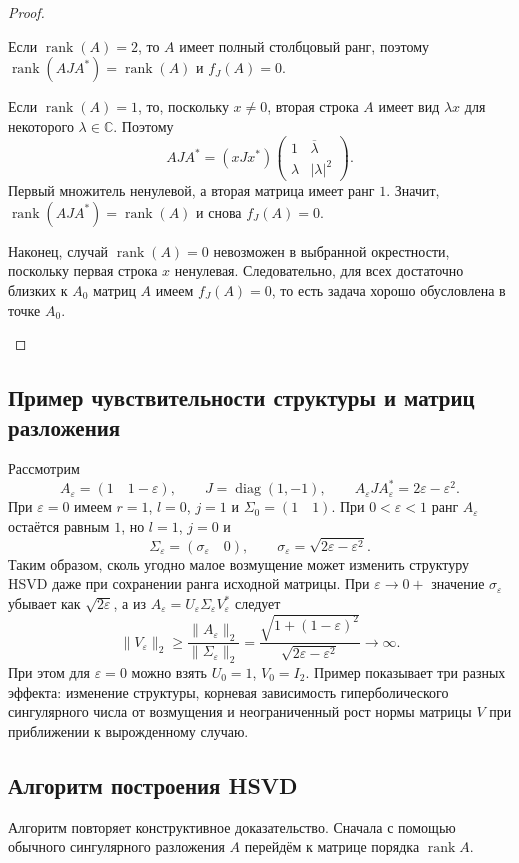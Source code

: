 \documentclass[a4paper,12pt]{article}
\DeclareMathOperator{\rank}{rank}
\DeclareMathOperator{\diag}{diag}
\theoremstyle{csstyle}
\newcommand{\HSVDComplex}{\mathbb C}
\begin{document}
\begin{proof}
\begin{enumerate}[label=\arabic*)]
    Если $\rank(A)=2$, то $A$ имеет полный столбцовый ранг, поэтому $\rank(AJA^*)=\rank(A)$ и $f_J(A)=0$.
    
    Если $\rank(A)=1$, то, поскольку $x\ne0$, вторая строка $A$ имеет вид $\lambda x$ для некоторого $\lambda\in\HSVDComplex$. Поэтому
    \[
    AJA^*
    =
    (xJx^*)
    \begin{pmatrix}
    1 & \overline{\lambda}\\
    \lambda & |\lambda|^2
    \end{pmatrix}.
    \]
    Первый множитель ненулевой, а вторая матрица имеет ранг $1$. Значит, $\rank(AJA^*)=\rank(A)$ и снова $f_J(A)=0$.
    
    Наконец, случай $\rank(A)=0$ невозможен в выбранной окрестности, поскольку первая строка $x$ ненулевая. Следовательно, для всех достаточно близких к $A_0$ матриц $A$ имеем $f_J(A)=0$, то есть задача хорошо обусловлена в точке $A_0$.\qedhere
    \end{enumerate}
\end{proof}


\subsection{Пример чувствительности структуры и матриц разложения}\label{subsec:factor-growth}

Рассмотрим
\[
A_\varepsilon=(1\quad1-\varepsilon),\qquad J=\diag(1,-1),
\qquad A_\varepsilon JA_\varepsilon^*=2\varepsilon-\varepsilon^2.
\]
При $\varepsilon=0$ имеем $r=1$, $l=0$, $j=1$ и
$\Sigma_0=(1\quad1)$. При $0<\varepsilon<1$ ранг $A_\varepsilon$
остаётся равным $1$, но $l=1$, $j=0$ и
\[
\Sigma_\varepsilon=(\sigma_\varepsilon\quad0),\qquad
\sigma_\varepsilon=\sqrt{2\varepsilon-\varepsilon^2}.
\]
Таким образом, сколь угодно малое возмущение может изменить структуру
HSVD даже при сохранении ранга исходной матрицы.
При $\varepsilon\to0+$ значение $\sigma_\varepsilon$ убывает
как $\sqrt{2\varepsilon}$, а из $A_\varepsilon=U_\varepsilon
\Sigma_\varepsilon V_\varepsilon^*$ следует
\[
\|V_\varepsilon\|_2\ge
\frac{\|A_\varepsilon\|_2}{\|\Sigma_\varepsilon\|_2}
=\frac{\sqrt{1+(1-\varepsilon)^2}}{\sqrt{2\varepsilon-\varepsilon^2}}
\longrightarrow\infty.
\]
При этом для $\varepsilon=0$ можно взять $U_0=1$, $V_0=I_2$.
Пример показывает три разных эффекта: изменение структуры,
корневая зависимость гиперболического сингулярного числа
от возмущения и неограниченный рост нормы матрицы $V$ при приближении к вырожденному случаю.


\subsection{Алгоритм построения HSVD}\label{sec:algorithm}
Алгоритм повторяет конструктивное доказательство. Сначала с помощью
обычного сингулярного разложения $A$ перейдём к матрице порядка $\rank A$.
\end{document}
